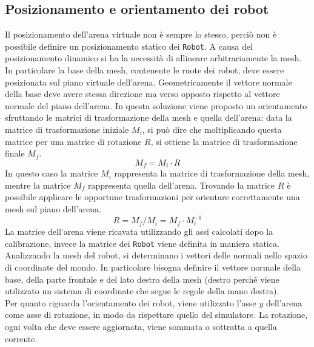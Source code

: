 \documentclass[12pt,a4paper,openright,oneside]{book}
\begin{document}
\subsection{Posizionamento e orientamento dei robot}\label{sub:posizionamento_e_orientamento_dei_robot} %
Il posizionamento dell'arena virtuale non è sempre lo stesso, perciò non è possibile definire un posizionamento statico dei \texttt{Robot}.
A causa del posizionamento dinamico si ha la necessità di allineare arbitrariamente la mesh. In particolare la base della mesh, contenente le ruote dei robot, deve essere posizionata sul piano virtuale dell'arena.
Geometricamente il vettore normale della base deve avere stessa direzione ma verso opposto rispetto al vettore normale del piano dell'arena.
In questa soluzione viene proposto un orientamento sfruttando le matrici di trasformazione della mesh e quella dell'arena: data la matrice di trasformazione iniziale $M_i$, si può dire che moltiplicando questa matrice per una matrice di rotazione $R$, si ottiene la matrice di trasformazione finale $M_f$.
\[
    M_f = M_i \cdot R
\]
In questo caso la matrice $M_i$ rappresenta la matrice di trasformazione della mesh, mentre la matrice $M_f$ rappresenta quella dell'arena. Trovando la matrice $R$ è possibile applicare le opportune trasformazioni per orientare correttamente una mesh sul piano dell'arena.
\[
    R = M_f / M_i = M_f \cdot M_i^{-1}
\]
La matrice dell'arena viene ricavata utilizzando gli assi calcolati dopo la calibrazione, invece la matrice dei \texttt{Robot} viene definita in maniera statica. Analizzando la mesh del robot, si determinano i vettori delle normali nello spazio di coordinate del mondo. In particolare bisogna definire il vettore normale della base, della parte frontale e del lato destro della mesh (destro perché viene utilizzato un sistema di coordinate che segue le regole della mano destra).
\\
Per quanto riguarda l'orientamento dei robot, viene utilizzato l'asse $y$ dell'arena come asse di rotazione, in modo da rispettare quello del simulatore. La rotazione, ogni volta che deve essere aggiornata, viene sommata o sottratta a quella corrente.
%
%
\end{document}
